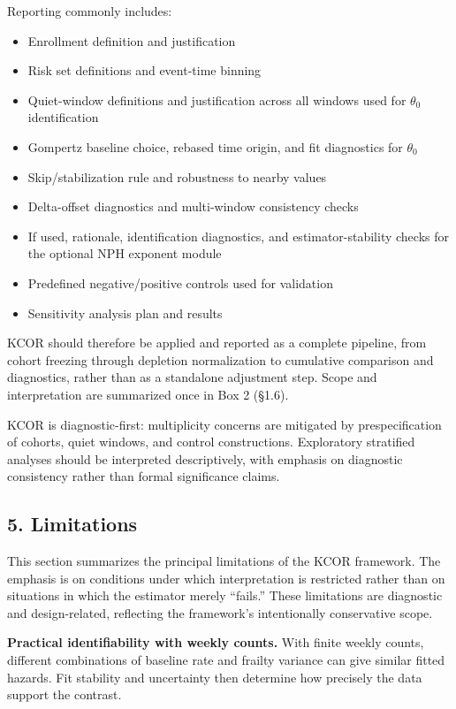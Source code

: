 \documentclass[
]{article}
\providecommand{\tightlist}{%
  \setlength{\itemsep}{0pt}\setlength{\parskip}{0pt}}
\begin{document}
Reporting commonly includes:

\begin{itemize}
\tightlist
\item
  Enrollment definition and justification
\item
  Risk set definitions and event-time binning
\item
  Quiet-window definitions and justification across all windows used for \(\theta_0\) identification
\item
  Gompertz baseline choice, rebased time origin, and fit diagnostics for \(\theta_0\)
\item
  Skip/stabilization rule and robustness to nearby values
\item
  Delta-offset diagnostics and multi-window consistency checks
\item
  If used, rationale, identification diagnostics, and estimator-stability checks for the optional NPH exponent module
\item
  Predefined negative/positive controls used for validation
\item
  Sensitivity analysis plan and results
\end{itemize}

KCOR should therefore be applied and reported as a complete pipeline, from cohort freezing through depletion normalization to cumulative comparison and diagnostics, rather than as a standalone adjustment step. Scope and interpretation are summarized once in Box 2 (§1.6).

KCOR is diagnostic-first: multiplicity concerns are mitigated by prespecification of cohorts, quiet windows, and control constructions. Exploratory stratified analyses should be interpreted descriptively, with emphasis on diagnostic consistency rather than formal significance claims.

\subsection{5. Limitations}\label{limitations}

This section summarizes the principal limitations of the KCOR framework. The emphasis is on conditions under which interpretation is restricted rather than on situations in which the estimator merely ``fails.'' These limitations are diagnostic and design-related, reflecting the framework's intentionally conservative scope.

\textbf{Practical identifiability with weekly counts.} With finite weekly counts, different combinations of baseline rate and frailty variance can give similar fitted hazards. Fit stability and uncertainty then determine how precisely the data support the contrast.
\end{document}
